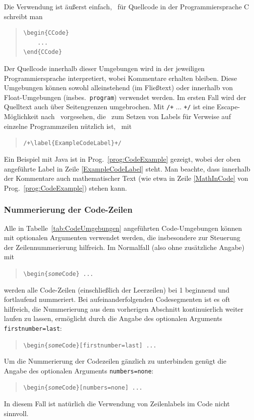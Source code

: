 %
Die Verwendung ist äußerst einfach, \zB\ für Quellcode in der Programmiersprache C schreibt man
%
\begin{quote}
\begin{verbatim}
\begin{CCode}
    ... 
\end{CCode}
\end{verbatim}
\end{quote}
%
Der Quellcode innerhalb dieser Umgebungen wird in der jeweiligen Programmiersprache interpretiert, wobei Kommentare erhalten bleiben. Diese Umgebungen können sowohl alleinstehend (im Fließtext) oder innerhalb von Float-Umgebungen (insbes.\ \texttt{program}) verwendet werden. Im ersten Fall wird der Quelltext auch über Seitengrenzen umgebrochen. Mit \verb!/+! ... \verb!+/! ist eine Escape-Möglichkeit nach \latex\ vorgesehen, die \va\ zum Setzen von Labels für Verweise auf einzelne Programmzeilen nützlich ist, \zB\ mit
%
\begin{quote}
\verb!/+\label{ExampleCodeLabel}+/!
\end{quote}
%
Ein Beispiel mit Java ist in Prog.~\ref{prog:CodeExample} gezeigt, wobei der oben angeführte Label in Zeile \ref{ExampleCodeLabel} steht.
Man beachte, dass innerhalb der Kommentare auch mathematischer Text 
(wie etwa in Zeile \ref{MathInCode} von Prog.~\ref{prog:CodeExample}) stehen kann.


\subsubsection{Nummerierung der Code-Zeilen}

Alle in Tabelle~\ref{tab:CodeUmgebungen} angeführten Code-Umgebungen können
mit optionalen Argumenten verwendet werden, die insbesondere zur Steuerung der
Zeilennummerierung hilfreich. 
Im Normalfall (also ohne zusätzliche Angabe) mit
%
\begin{quote}
\verb!\begin{!\texttt{\emph{some}Code}\verb!} ... !
\end{quote}
%
werden alle Code-Zeilen (einschließlich der Leerzeilen) bei 1 beginnend und 
fortlaufend nummeriert.
%
Bei aufeinanderfolgenden Codesegmenten ist es oft hilfreich, die Nummerierung 
aus dem vorherigen Abschnitt kontinuierlich weiter laufen zu lassen,
ermöglicht durch die Angabe des optionalen Arguments 
\texttt{firstnumber={\obnh}last}:
%
\begin{quote}
\verb!\begin{!\texttt{\emph{some}Code}\verb!}[firstnumber=last] ... !
\end{quote}
%
Um die Nummerierung der Codezeilen gänzlich zu unterbinden genügt die Angabe
des optionalen Arguments
\texttt{numbers={\obnh}none}:
%
\begin{quote}
\verb!\begin{!\texttt{\emph{some}Code}\verb!}[numbers=none] ... !
\end{quote}
%
In diesem Fall ist natürlich die Verwendung von Zeilenlabels im Code nicht
sinnvoll.


